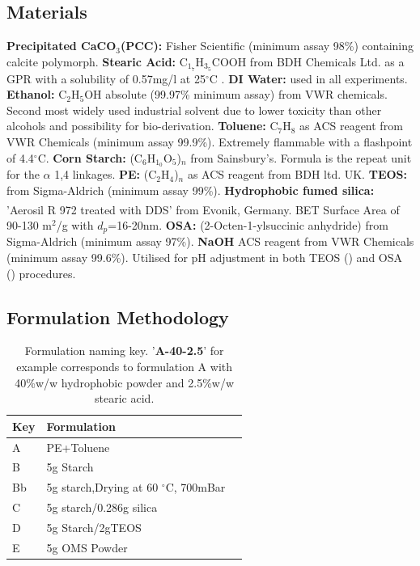 \subsection{Materials} 
\textbf{Precipitated CaCO$_3$(PCC):} Fisher Scientific (minimum assay 98\%) containing calcite polymorph.
\textbf{Stearic Acid:} C$_1_7$H$_3_5$COOH from BDH Chemicals Ltd. as a GPR with a solubility of 0.57mg/l at 25$^\circ$C \cite{stearic}. 
\textbf{DI Water:} used in all experiments.
\textbf{Ethanol:} C$_2$H$_5$OH absolute (99.97\% minimum assay) from VWR chemicals. Second most widely used industrial solvent due to lower toxicity than other alcohols and possibility for bio-derivation. \textbf{Toluene:} C$_7$H$_8$ as ACS reagent from VWR Chemicals (minimum assay 99.9\%). Extremely flammable with a flashpoint of 4.4$^\circ$C.
\textbf{Corn Starch:} (C$_6$H$_1_0$O$_5$)$_n$ from Sainsbury's. Formula is the repeat unit for the ${\alpha}$ 1,4 linkages.  
\textbf{PE:} (C$_2$H$_4$)$_n$ as ACS reagent from BDH ltd. UK.
\textbf{TEOS:} from Sigma-Aldrich (minimum assay 99\%). \textbf{Hydrophobic fumed silica:} 'Aerosil \textsuperscript \textregistered  R 972 treated with DDS' from Evonik, Germany. BET Surface Area of 90-130 m$^2$/g with $d_p$=16-20nm. \textbf{OSA:} (2-Octen-1-ylsuccinic anhydride) from Sigma-Aldrich (minimum assay 97\%). \textbf{NaOH} ACS reagent from VWR Chemicals (minimum assay 99.6\%). Utilised for pH adjustment in both TEOS (\cite{TEOS}) and OSA (\cite{OMSProcess}) procedures.
\subsection{Formulation Methodology}
\begin{table} [H]
\centering
\begin{tabular}{llr}
\toprule
Key & Formulation\\
\midrule
A   & PE+Toluene              \\ 
B   & 5g Starch               \\ 
Bb  & 5g starch,Drying at 60 $^\circ$C, 700mBar \\ 
C   & 5g starch/0.286g silica \\ 
D   & 5g Starch/2gTEOS        \\ 
E   & 5g OMS Powder           \\ 
\bottomrule
\end{tabular}
\caption{Formulation naming key. '\textbf{A-40-2.5}' for example corresponds to formulation A with 40\%w/w hydrophobic powder and 2.5\%w/w stearic acid.}
\label{Key}
\end{table}

